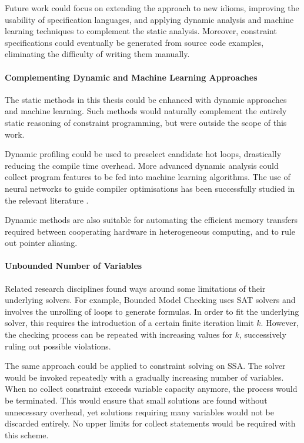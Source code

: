     Future work could focus on extending the approach to new idioms,
    improving the usability of specification languages, and applying dynamic
    analysis and machine learning techniques to complement the static analysis.
    Moreover, constraint specifications could eventually be generated from
    source code examples, eliminating the difficulty of writing them manually.

\paragraph*{Complementing Dynamic and Machine Learning Approaches}

    The static methods in this thesis could be enhanced with dynamic approaches
    and machine learning.
    Such methods would naturally complement the entirely static reasoning of
    constraint programming, but were outside the scope of this work.

    Dynamic profiling could be used to preselect candidate hot loops,
    drastically reducing the compile time overhead.
    More advanced dynamic analysis could collect program features to be fed into
    machine learning algorithms.
    The use of neural networks to guide compiler optimisations has been
    successfully studied in the relevant literature
    \citep{DBLP:journals/pieee/WangO18}.

    Dynamic methods are also suitable for automating the efficient memory
    transfers required between cooperating hardware in heterogeneous
    computing, and to rule out pointer aliasing.

\paragraph*{Unbounded Number of Variables}

    Related research disciplines found ways around some limitations of their
    underlying solvers.
    For example, Bounded Model Checking \cite{Clarke:2001:BMC:510986.510987}
    uses SAT solvers and involves the unrolling of loops to generate formulas.
    In order to fit the underlying solver, this requires the introduction of a
    certain finite iteration limit $k$.
    However, the checking process can be repeated with increasing values for
    $k$, successively ruling out possible violations.

    The same approach could be applied to constraint solving on SSA.
    The solver would be invoked repeatedly with a gradually increasing number of
    variables.
    When no collect constraint exceeds variable capacity anymore, the
    process would be terminated.
    This would ensure that small solutions are found without unnecessary
    overhead, yet solutions requiring many variables would not be discarded
    entirely.
    No upper limits for collect statements would be required with this scheme.

